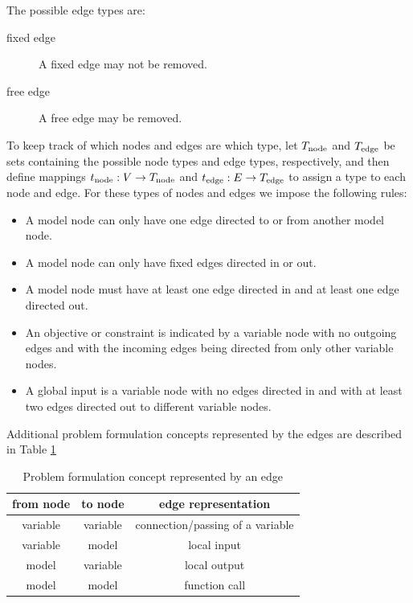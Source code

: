 The possible edge types are:
\begin{description}
\item[fixed edge] A fixed edge may not be removed.
\item[free edge] A free edge may be removed.
\end{description}
To keep track of which nodes and edges are which type, let $T_\textrm{node}$ and $T_\textrm{edge}$ be sets containing the possible node types and edge types, respectively, and then define mappings $t_\textrm{node}:V \to T_\textrm{node}$ and $t_\textrm{edge}:E \to T_\textrm{edge}$ to assign a type to each node and edge.
For these types of nodes and edges we impose the following rules:
\begin{itemize}
\item A model node can only have one edge directed to or from another model node.
\item A model node can only have fixed edges directed in or out.
\item A model node must have at least one edge directed in and at least one edge directed out.
\item An objective or constraint is indicated by a variable node with no outgoing edges and with the incoming edges being directed from only other variable nodes.
\item A global input is a variable node with no edges directed in and with at least two edges directed out to different variable nodes.
\end{itemize}
Additional problem formulation concepts represented by the edges are described in Table \ref{t:edge representation}
\begin{table}[h!]
 \begin{center}
  \caption{Problem formulation concept represented by an edge}
  \label{t:edge representation}
  \begin{tabular}{ccc} \hline 
from node & to node & edge representation \\ \hline
variable & variable & connection/passing of a variable\\
variable & model & local input \\
model & variable & local output \\
model & model & function call \\ \hline
  \end{tabular}
 \end{center}
 \vspace{-15pt}
\end{table}

